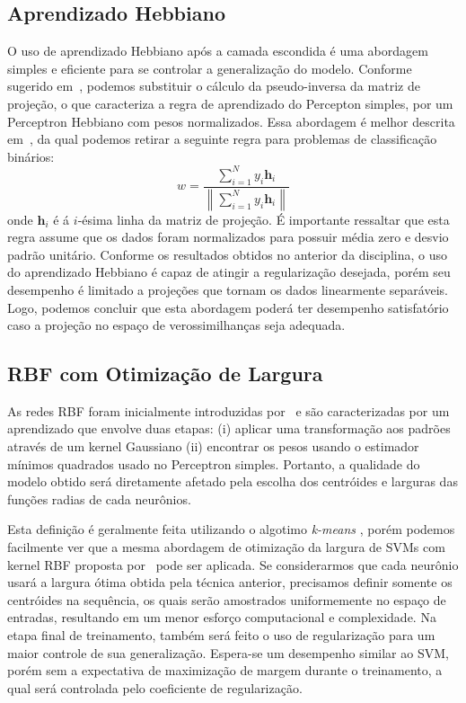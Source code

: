 \documentclass[conference]{IEEEtran}
\begin{document}
	\subsection{Aprendizado Hebbiano}
	O uso de aprendizado Hebbiano após a camada escondida é uma abordagem simples e eficiente para se controlar a generalização do modelo. Conforme sugerido em~\cite{horta2015aplicaccao}, podemos substituir o cálculo da pseudo-inversa da matriz de projeção, o que caracteriza a regra de aprendizado do Percepton simples, por um Perceptron Hebbiano com pesos normalizados. Essa abordagem é melhor descrita em~\cite{fernandez2011direct}, da qual podemos retirar a seguinte regra para problemas de classificação binários:
	\begin{equation}
		w = \frac{ \sum^{N}_{i=1} y_i\textbf{h}_i}{\left\|  \sum^{N}_{i=1} y_i\textbf{h}_i \right\| }
	\end{equation}
	onde $\textbf{h}_i$ é á $i$-ésima linha da matriz de projeção. É importante ressaltar que esta regra assume que os dados foram normalizados para possuir média zero e desvio padrão unitário. Conforme os resultados obtidos no anterior da disciplina, o uso do aprendizado Hebbiano é capaz de atingir a regularização desejada, porém seu desempenho é limitado a projeções que tornam os dados linearmente separáveis. Logo, podemos concluir que esta abordagem poderá ter desempenho satisfatório caso a projeção no espaço de verossimilhanças seja adequada.
	
	\subsection{RBF com Otimização de Largura}
	As redes RBF foram inicialmente introduzidas por~\cite{broomhead1988multivariablefi} e são caracterizadas por um aprendizado que envolve duas etapas: (i) aplicar uma transformação aos padrões através de um kernel Gaussiano (ii) encontrar os pesos usando o estimador mínimos quadrados usado no Perceptron simples. Portanto, a qualidade do modelo obtido será diretamente afetado pela escolha dos centróides e larguras das funções radias de cada neurônios. 
	
	Esta definição é geralmente feita utilizando o algotimo \textit{k-means} \cite{haykin2007neural}, porém podemos facilmente ver que a mesma abordagem de otimização da largura de SVMs com kernel RBF proposta por~\cite{menezes2019width} pode ser aplicada. Se considerarmos que cada neurônio usará a largura ótima obtida pela técnica anterior, precisamos definir somente os centróides na sequência, os quais serão amostrados uniformemente no espaço de entradas, resultando em um menor esforço computacional e complexidade. Na etapa final de treinamento, também será feito o uso de regularização para um maior controle de sua generalização. Espera-se um desempenho similar ao SVM, porém sem a expectativa de maximização de margem durante o treinamento, a qual será controlada pelo coeficiente de regularização.
	
\end{document}
